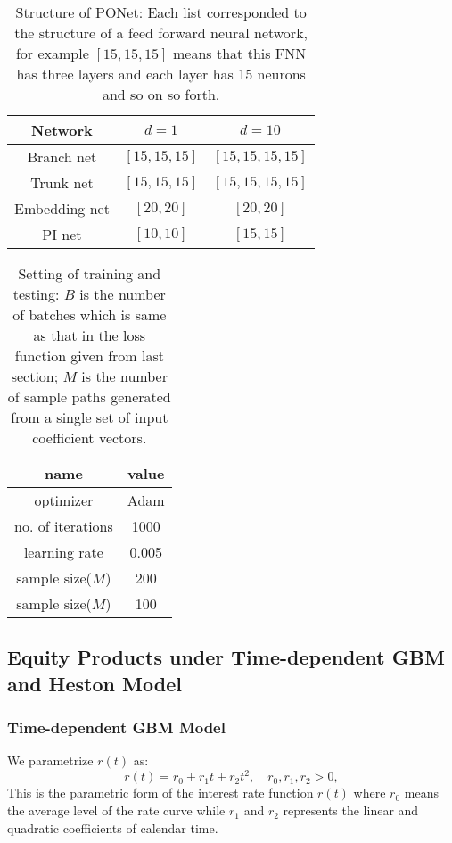 \documentclass[11pt,a4paper]{article}
\theoremstyle{remark}
\begin{document}
	\begin{table}[htbp!]
		\centering
		\begin{tabular}{ccc}
			\hline 
			Network  & $d=1$ & $d=10$ \\
			\hline  
			Branch net &  $[15, 15, 15]$  & $[15, 15, 15, 15]$  \\
			Trunk net& $[15, 15, 15]$  & $[15, 15, 15, 15]$  \\
			
			Embedding net& $[20, 20]$ & $[20, 20]$  \\
			PI net& $[10, 10]$  & $[15, 15]$  \\
			\hline
		\end{tabular}
		\caption{Structure of PONet: Each list corresponded to the structure of a feed forward neural network, for example $[15, 15, 15]$ means that this FNN has three layers and each layer has 15 neurons and so on so forth.}
		\label{tab:PONet}
	\end{table}
	
	\begin{table}[htbp!]
		\centering
		\begin{tabular}{cc}
			\hline 
			name & value \\
			\hline   optimizer &Adam \\
			no. of iterations & 1000\\
			learning rate & 0.005\\
			sample size($M$)  & 200\\
			sample size($M$)  & 100\\
			\hline
		\end{tabular}
		\caption{Setting of training and testing: $B$ is the number of batches which is same as that in the loss function given from last section; $M$ is the number of sample paths generated from a single set of input coefficient vectors.}
		\label{tab:train-test}
	\end{table}
	
	
	
	\subsection{Equity Products under Time-dependent GBM and Heston Model}
	\subsubsection{Time-dependent GBM Model}
	We parametrize $r(t)$ as:
	\begin{equation}
		r(t) =r_0 + r_1 t + r_2 t^2,\quad r_0, r_1, r_2>0,
	\end{equation}
	This is the parametric form of the interest rate function $r(t)$ where $r_0$ means the average level of the rate curve while $r_1$ and $r_2$ represents the linear and quadratic coefficients of calendar time. 
	
\end{document}
